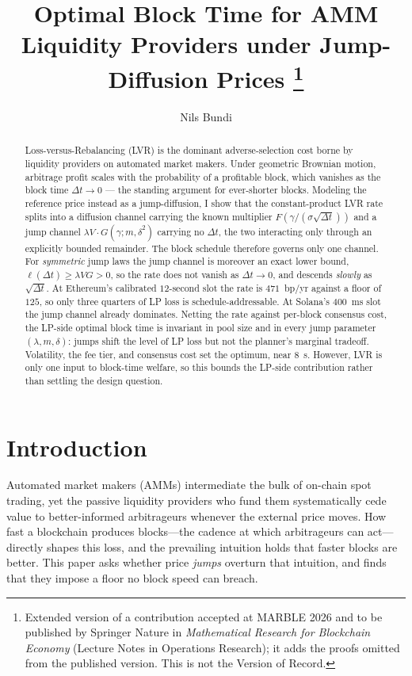 \documentclass[runningheads]{llncs}
\title{Optimal Block Time for AMM\\ Liquidity Providers under Jump-Diffusion Prices%
\ifextended\thanks{Extended version of a contribution accepted at MARBLE 2026 and to be
published by Springer Nature in \emph{Mathematical Research for Blockchain Economy} (Lecture
Notes in Operations Research); it adds the proofs omitted from the published version. This is
not the Version of Record.}\fi}
\author{Nils Bundi\orcidID{0000-0003-3576-3289}}
\institute{Zurich University of Applied Sciences, School of Engineering,\\
Winterthur, Switzerland\\
\email{bund@zhaw.ch}}
\newcommand{\dt}{\Delta t}
\newcommand{\1}{\mathbf{1}}
\begin{document}
\maketitle

\begin{abstract}
Loss-versus-Rebalancing (LVR) is the dominant adverse-selection cost borne by liquidity providers on automated market makers. Under geometric Brownian motion, arbitrage profit scales with the probability of a profitable block, which vanishes as the block time $\dt \to 0$ --- the standing argument for ever-shorter blocks. Modeling the reference price instead as a jump-diffusion, I show that the constant-product LVR rate splits into a diffusion channel carrying the known multiplier $F(\gamma/(\sigma\sqrt{\dt}))$ and a jump channel $\lambda V \cdot G(\gamma;m,\delta^2)$ carrying no $\dt$, the two interacting only through an explicitly bounded remainder. The block schedule therefore governs only one channel. For \emph{symmetric} jump laws the jump channel is moreover an exact lower bound, $\ell(\dt) \ge \lambda V G > 0$, so the rate does not vanish as $\dt \to 0$, and descends \emph{slowly} as $\sqrt{\dt}$. At Ethereum's calibrated $12$-second slot the rate is $471$~bp/yr against a floor of $125$, so only three quarters of LP loss is schedule-addressable. At Solana's $400$~ms slot the jump channel already dominates. Netting the rate against per-block consensus cost, the LP-side optimal block time is invariant in pool size and in every jump parameter $(\lambda,m,\delta)$: jumps shift the level of LP loss but not the planner's marginal tradeoff. Volatility, the fee tier, and consensus cost set the optimum, near $8$~s. However, LVR is only one input to block-time welfare, so this bounds the LP-side contribution rather than settling the design question.

\end{abstract}

\section{Introduction}\label{sec:intro}

Automated market makers (AMMs) intermediate the bulk of on-chain spot trading, yet the passive liquidity providers who fund them systematically cede value to better-informed arbitrageurs whenever the external price moves. How fast a blockchain produces blocks---the cadence at which arbitrageurs can act---directly shapes this loss, and the prevailing intuition holds that faster blocks are better. This paper asks whether price \emph{jumps} overturn that intuition, and finds that they impose a floor no block speed can breach.
\end{document}
